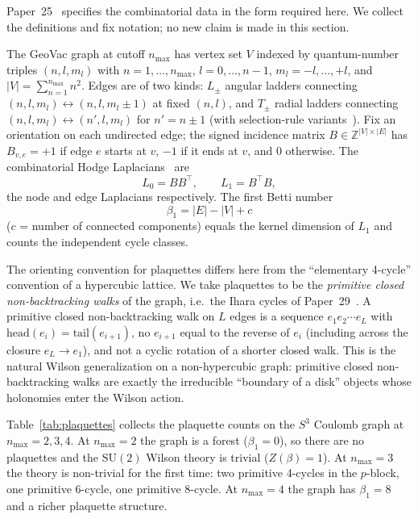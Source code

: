 \documentclass[11pt]{article}
\begin{document}
Paper~25~\cite{paper25} specifies the combinatorial data in the form
required here.  We collect the definitions and fix notation; no new
claim is made in this section.

The GeoVac graph at cutoff $n_{\max}$ has vertex set $V$ indexed by
quantum-number triples $(n, l, m_l)$ with $n = 1, \ldots, n_{\max}$,
$l = 0, \ldots, n-1$, $m_l = -l, \ldots, +l$, and $|V| =
\sum_{n=1}^{n_{\max}} n^2$.  Edges are of two kinds: $L_{\pm}$
angular ladders connecting $(n, l, m_l) \leftrightarrow
(n, l, m_l \pm 1)$ at fixed $(n, l)$, and $T_{\pm}$ radial ladders
connecting $(n, l, m_l) \leftrightarrow (n', l, m_l)$ for
$n' = n \pm 1$ (with selection-rule variants~\cite{paper7,paper14}).
Fix an orientation on each undirected edge; the signed incidence
matrix $B \in \mathbb{Z}^{|V| \times |E|}$ has $B_{v, e} = +1$ if edge
$e$ starts at $v$, $-1$ if it ends at $v$, and $0$ otherwise.  The
combinatorial Hodge Laplacians~\cite{lim2020,schaub2020} are
\begin{equation}
L_0 = B B^{\top}, \qquad L_1 = B^{\top} B,
\label{eq:hodge_laplacians}
\end{equation}
the node and edge Laplacians respectively.  The first Betti number
\begin{equation}
\beta_1 = |E| - |V| + c
\label{eq:betti1}
\end{equation}
($c$ = number of connected components) equals the kernel dimension of
$L_1$ and counts the independent cycle classes.

The orienting convention for plaquettes differs here from the ``elementary
4-cycle'' convention of a hypercubic lattice.  We take plaquettes to be
the \emph{primitive closed non-backtracking walks} of the graph, i.e.\
the Ihara cycles of Paper~29~\cite{paper29}.  A primitive closed
non-backtracking walk on $L$ edges is a sequence $e_1 e_2 \cdots e_L$
with $\mathrm{head}(e_i) = \mathrm{tail}(e_{i+1})$, no $e_{i+1}$ equal
to the reverse of $e_i$ (including across the closure $e_L \to e_1$),
and not a cyclic rotation of a shorter closed walk.  This is the
natural Wilson generalization on a non-hypercubic graph: primitive
closed non-backtracking walks are exactly the irreducible ``boundary
of a disk'' objects whose holonomies enter the Wilson action.

Table~\ref{tab:plaquettes} collects the plaquette counts on the
$S^3$ Coulomb graph at $n_{\max} = 2, 3, 4$.  At $n_{\max} = 2$
the graph is a forest ($\beta_1 = 0$), so there are no plaquettes
and the $\mathrm{SU}(2)$ Wilson theory is trivial ($Z(\beta) = 1$).
At $n_{\max} = 3$ the theory is non-trivial for the first time: two
primitive 4-cycles in the $p$-block, one primitive 6-cycle, one
primitive 8-cycle.  At $n_{\max} = 4$ the graph has
$\beta_1 = 8$ and a richer plaquette structure.
\end{document}
